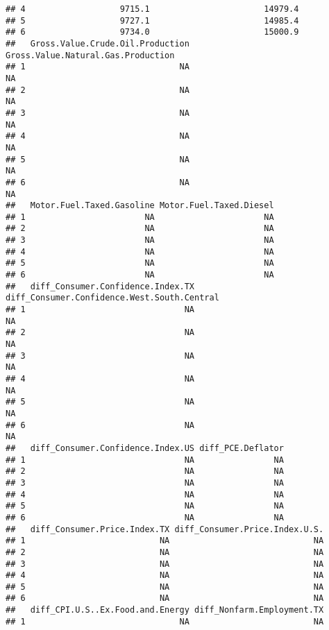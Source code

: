 \documentclass[
]{article}
\begin{document}
\begin{verbatim}
## 4                   9715.1                       14979.4
## 5                   9727.1                       14985.4
## 6                   9734.0                       15000.9
##   Gross.Value.Crude.Oil.Production Gross.Value.Natural.Gas.Production
## 1                               NA                                 NA
## 2                               NA                                 NA
## 3                               NA                                 NA
## 4                               NA                                 NA
## 5                               NA                                 NA
## 6                               NA                                 NA
##   Motor.Fuel.Taxed.Gasoline Motor.Fuel.Taxed.Diesel
## 1                        NA                      NA
## 2                        NA                      NA
## 3                        NA                      NA
## 4                        NA                      NA
## 5                        NA                      NA
## 6                        NA                      NA
##   diff_Consumer.Confidence.Index.TX diff_Consumer.Confidence.West.South.Central
## 1                                NA                                          NA
## 2                                NA                                          NA
## 3                                NA                                          NA
## 4                                NA                                          NA
## 5                                NA                                          NA
## 6                                NA                                          NA
##   diff_Consumer.Confidence.Index.US diff_PCE.Deflator
## 1                                NA                NA
## 2                                NA                NA
## 3                                NA                NA
## 4                                NA                NA
## 5                                NA                NA
## 6                                NA                NA
##   diff_Consumer.Price.Index.TX diff_Consumer.Price.Index.U.S.
## 1                           NA                             NA
## 2                           NA                             NA
## 3                           NA                             NA
## 4                           NA                             NA
## 5                           NA                             NA
## 6                           NA                             NA
##   diff_CPI.U.S..Ex.Food.and.Energy diff_Nonfarm.Employment.TX
## 1                               NA                         NA

\end{verbatim}
\end{document}
